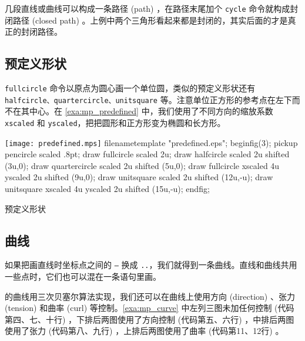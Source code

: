 几段直线或曲线可以构成一条路径 (path) ，在路径末尾加个 \texttt{cycle} 命令就构成封闭路径 (closed path) 。上例中两个三角形看起来都是封闭的，其实后面的才是真正的封闭路径。

\subsection{预定义形状}

 \texttt{fullcircle} 命令以原点为圆心画一个单位圆，类似的预定义形状还有 \texttt{halfcircle、quartercircle、unitsquare} 等。注意单位正方形的参考点在左下而不在其中心。在 \autoref{exa:mp_predefined} 中，我们使用了不同方向的缩放系数 \texttt{xscaled} 和 \texttt{yscaled}，把把圆形和正方形变为椭圆和长方形。

\begin{example}[!h]
\begin{FBTDemo}[numbers=left]{\texttt{[image: predefined.mps]}}
filenametemplate "predefined.eps";
beginfig(3);
pickup pencircle scaled .8pt;
draw fullcircle scaled 2u;
draw halfcircle scaled 2u shifted (3u,0);
draw quartercircle scaled 2u shifted (5u,0);
draw fullcircle xscaled 4u yscaled 2u shifted (9u,0);
draw unitsquare scaled 2u shifted (12u,-u);
draw unitsquare xscaled 4u yscaled 2u shifted (15u,-u);
endfig;
\end{FBTDemo}
\caption{\MP 预定义形状}
\label{exa:mp_predefined}
\end{example}

\subsection{曲线}

如果把画直线时坐标点之间的 \texttt{--} 换成 \texttt{..}，我们就得到一条曲线。直线和曲线共用一些点时，它们也可以混在一条语句里画。

\MP 的曲线用三次贝塞尔算法实现，我们还可以在曲线上使用方向 (direction) 、张力 (tension) 和曲率 (curl) 等控制。\autoref{exa:mp_curve} 中左列三图未加任何控制 (代码第四、七、十行) ，下排后两图使用了方向控制 (代码第五、六行) ，中排后两图使用了张力 (代码第八、九行) ，上排后两图使用了曲率 (代码第11、12行) 。

